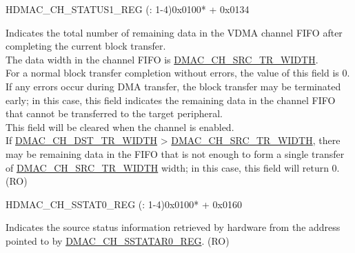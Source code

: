 \begin{register}{H}{DMAC\_CH\_STATUS1\_REG (: 1-4)}{0x0100* + 0x0134}\label{regdesc:DMACCHNSTATUS1REG}
%
%
\regnewline%
\begin{regdesc}\begin{reglist}
\label{fielddesc:DMACCHNDATALEFTINFIFO}\item [DMAC\_CH\regindex{n}\_DATA\_LEFT\_IN\_FIFO] Indicates the total number of remaining data in the VDMA channel FIFO after completing the current block transfer. \\
The data width in the channel FIFO is \hyperref[fielddesc:DMACCHNSRCTRWIDTH]{DMAC\_CH\_SRC\_TR\_WIDTH}. \\
For a normal block transfer completion without errors, the value of this field is 0. If any errors occur during DMA transfer, the block transfer may be terminated early; in this case, this field indicates the remaining data in the channel FIFO that cannot be transferred to the target peripheral. \\
This field will be cleared when the channel is enabled. \\
If \hyperref[fielddesc:DMACCHNDSTTRWIDTH]{DMAC\_CH\_DST\_TR\_WIDTH} > \hyperref[fielddesc:DMACCHNSRCTRWIDTH]{DMAC\_CH\_SRC\_TR\_WIDTH}, there may be remaining data in the FIFO that is not enough to form a single transfer of \hyperref[fielddesc:DMACCHNSRCTRWIDTH]{DMAC\_CH\_SRC\_TR\_WIDTH} width; in this case, this field will return 0. \\
(RO)

\end{reglist}\end{regdesc}
\end{register}


\begin{register}{H}{DMAC\_CH\_SSTAT0\_REG (: 1-4)}{0x0100* + 0x0160}\label{regdesc:DMACCHNSSTAT0REG}
%
\regnewline%
\begin{regdesc}\begin{reglist}
\label{fielddesc:DMACCHNSSTAT}\item [DMAC\_CH\regindex{n}\_SSTAT] 
Indicates the source status information retrieved by hardware from the address pointed to by \hyperref[regdesc:DMACCHNSSTATAR0REG]{DMAC\_CH\_SSTATAR0\_REG}. (RO)
\end{reglist}\end{regdesc}
\end{register}


